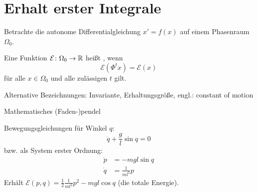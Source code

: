 \section{Erhalt erster Integrale}

Betrachte die autonome Differentialgleichung $x'=f(x)$ auf einem Phasenraum $\Omega_0$.

\begin{definition}
	Eine Funktion $\mathcal E \colon \Omega_0 \to \mathbb R$ heißt , wenn
	\begin{equation*}
		\mathcal E(\Phi^t x) = \mathcal E(x)
	\end{equation*}
	für alle $x\in\Omega_0$ und alle zulässigen $t$ gilt.
\end{definition}

Alternative Bezeichnungen: Invariante, Erhaltungsgröße, engl.: constant of motion

\begin{bsp}
	Mathematisches (Faden-)pendel
	\begin{center}
	\end{center}
	
	Bewegungsgleichungen für Winkel $q$:
	\begin{equation*}
		\ddot{q} + \frac{g}{l} \sin q = 0
	\end{equation*}
	bzw. als System erster Ordnung:
	\begin{equation*}
		\begin{aligned}
			\dot{p} &= - mgl \sin q\\
			\dot{q} &= \frac{1}{ml^2} p
		\end{aligned}
	\end{equation*}
	Erhält $\mathcal E(p,q) = \frac{1}{2} \frac{1}{ml^2} p^2 - mgl \cos q $ (die totale Energie).
\end{bsp}

